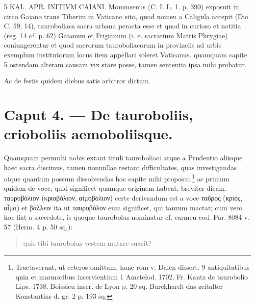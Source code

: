 \documentclass[a4paper, 11pt, oneside, polutonikogreek, german]{article}
\begin{document}
5 KAL. APR. INITIVM CAIANI. Mommsenus (C. I. L. 1. p. 390) exposuit in circo Gaiano trans Tiberim in Vaticano sito, quod nomen a Caligula accepit (Dio C. 59, 14), tauroboliaca sacra urbana peracta esse et quod in curioso et notitia (reg. 14 cf. p. 62) Gaianum et Frigianum (i. e. sacrarium Matris Phrygiae) coniungerentur et quod sacrorum tauroboliacorum in provinciis ad urbis exemplum institutorum locus item appellari soleret Vaticanus. quamquam capite 5 ostendam alteram causam vix stare posse, tamen sententia ipsa mihi probatur.

Ac de festis quidem diebus satis arbitror dictum.
\clearpage
\section{Caput 4. --- De tauroboliis, crioboliis aemoboliisque.}
\paragraph{}
Quamquam permulti nobis extant tituli tauroboliaci atque a Prudentio aliisque haec sacra discimus, tamen nonnullae restant difficultates, quas investigandas atque quantum possum dissolvendas hoc capite mihi proposui.\footnote{Tractaverunt, ut ceteros omittam, hanc rom v. Dalen dissert. 9 antiquitatibus quin et marmoribus inservientium 1 Amstelod. 1702. Fr. Kautz de taurobolio Lips. 1738. Boissieu inscr. de Lyon p. 20 sq. Burckhardt das zeitalter Konstantins d. gr. 2 p. 193 sq.} ac primum quidem de voce, quid significet quamque originem habeat, breviter dicam. ταυροβόλιον (κριοβόλιον, αἱμοβόλιον) certe derivandum est a voce ταῦρος (κριός, αἷμα) et βάλλειν ita ut ταυροβόλον eum significet, qui taurum mactat; cum vero hoc fiat a sacerdote, is quoque taurobolus nominatur cf. carmeu cod. Par. 8084 v. 57 (Herm. 4 p. 50 sq.):
\begin{quotation}
quis tibi taurobolus vestem mutare suasit?
\end{quotation}
\end{document}
